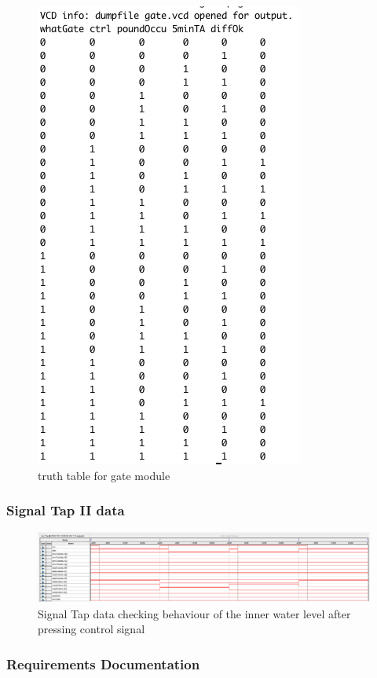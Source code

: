\documentclass{article}
\begin{document}
      \begin{figure} [H]
        \centering
        \includegraphics[width=0.55\linewidth]{figures/gate_truthtable.png}
        \caption{truth table for gate module}
        \label{fig:gate_truthtable}
      \end{figure}
    
    \subsubsection{Signal Tap II data}
      \begin{figure} [H]
        \centering
        \includegraphics[width=0.75\linewidth]{figures/signaltap/stp_innerWaterLvl.PNG}
        \caption{Signal Tap data checking behaviour of the inner water level after pressing control signal}
        \label{fig:stp_innerWaterLvl}
      \end{figure}

    \subsubsection{Requirements Documentation}
\end{document}
